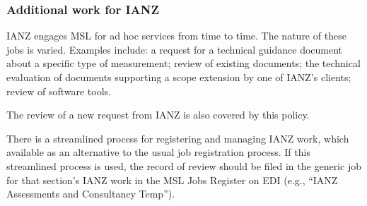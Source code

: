 \subsubsection{Additional work for IANZ}
IANZ engages MSL for ad hoc services from time to time. The nature of these jobs is varied. Examples include: a request for a technical guidance document about a specific type of measurement; review of existing documents; the technical evaluation of documents supporting a scope extension by one of IANZ’s clients; review of software tools. 

The review of a new request from IANZ is also covered by this policy.

There is a streamlined process for registering and managing IANZ work, which available as an alternative to the usual job registration process. If this streamlined process is used, the record of review should be filed in the generic job for that section’s IANZ work in the MSL Jobs Register on EDI (e.g., ``IANZ Assessments and Consultancy Temp''). 